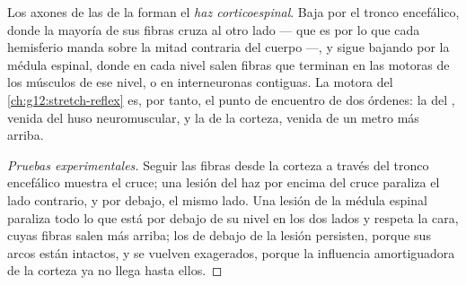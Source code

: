 \begin{proposition}\label{prop:g12:brain-and-movement:pathway}
Los axones de las  de la  forman el \emph{haz
corticoespinal}. Baja por el tronco
encefálico, donde la mayoría de sus fibras cruza al otro lado --- que
es por lo que cada hemisferio manda sobre la mitad contraria del cuerpo
---, y sigue bajando por la médula espinal, donde en cada nivel salen
fibras que terminan en las  motoras de los músculos de ese
nivel, o en interneuronas contiguas. La  motora del
\cref{ch:g12:stretch-reflex} es, por tanto, el punto de encuentro de
dos órdenes: la del , venida del huso neuromuscular, y la
de la corteza, venida de un metro más arriba.
\end{proposition}
\begin{proof}[Pruebas experimentales]
Seguir las fibras desde la corteza a través del tronco encefálico
muestra el cruce; una lesión del haz por encima del cruce paraliza el
lado contrario, y por debajo, el mismo lado. Una lesión de la médula
espinal paraliza todo lo que está por debajo de su nivel en los dos
lados y respeta la cara, cuyas fibras salen más arriba; los  de
debajo de la lesión persisten, porque sus arcos están intactos, y se
vuelven exagerados, porque la influencia amortiguadora de la corteza ya
no llega hasta ellos.
\end{proof}

